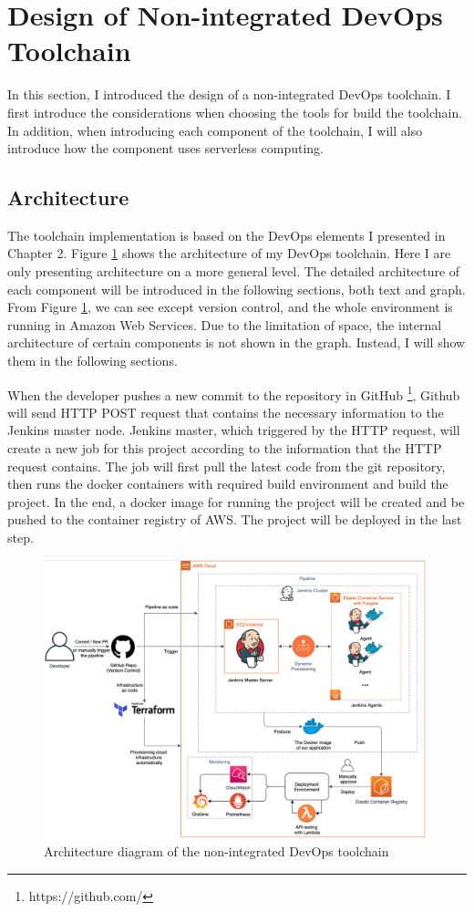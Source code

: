 \section{Design of Non-integrated DevOps Toolchain}
In this section, I introduced the design of a non-integrated DevOps toolchain. I first introduce the considerations when choosing the tools for build the toolchain. In addition, when introducing each component of the toolchain, I will also introduce how the component uses serverless computing.
\subsection{Architecture}
The toolchain implementation is based on the DevOps elements I presented in Chapter 2. Figure \ref{fig:archjenkins} shows the architecture of my DevOps toolchain. Here I are only presenting architecture on a more general level. The detailed architecture of each component will be introduced in the following sections, both text and graph. From Figure \ref{fig:archjenkins}, we can see except version control, and the whole environment is running in Amazon Web Services. Due to the limitation of space, the internal architecture of certain components is not shown in the graph. Instead, I will show them in the following sections.
\par
When the developer pushes a new commit to the repository in GitHub \footnote{https://github.com/}, Github will send HTTP POST request that contains the necessary information to the Jenkins master node. Jenkins master, which triggered by the HTTP request, will create a new job for this project according to the information that the HTTP request contains. The job will first pull the latest code from the git repository, then runs the docker containers with required build environment and build the project. In the end, a docker image for running the project will be created and be pushed to the container registry of AWS. The project will be deployed in the last step.
\begin{figure}[h]
     \centering
     \includegraphics[width=0.99\textwidth]{pics/arch-med-jenkins.png}
     \caption{Architecture diagram of the non-integrated DevOps toolchain}
     \label{fig:archjenkins}
     \end{figure}

